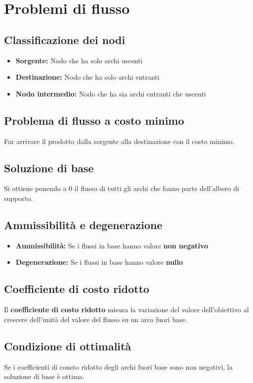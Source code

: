 \chapter{Problemi di flusso}

\section{Classificazione dei nodi}
\begin{itemize}
  \item \textbf{Sorgente:} Nodo che ha solo archi uscenti
  \item \textbf{Destinazione:} Nodo che ha solo archi entranti
  \item \textbf{Nodo intermedio:} Nodo che ha sia archi entranti che uscenti
\end{itemize}

\section{Problema di flusso a costo minimo}
Far arrivare il prodotto dalla sorgente alla destinazione con il costo minimo.

\section{Soluzione di base}
Si ottiene ponendo a $0$ il flusso di tutti gli archi che fanno parte dell'albero di supporto.

\section{Ammissibilit\`a e degenerazione}
\begin{itemize}
  \item \textbf{Ammissibilit\`a:} Se i flussi in base hanno valore \textbf{non negativo}
  \item \textbf{Degenerazione:} Se i flussi in base hanno valore \textbf{nullo}
\end{itemize}


\section{Coefficiente di costo ridotto}
Il \textbf{coefficiente di costo ridotto} misura la variazione del valore dell'obiettivo al crescere dell'unit\`a del valore del flusso su un arco fuori base.

\section{Condizione di ottimalit\`a}
Se i coefficienti di consto ridotto degli archi fuori base sono non negativi, la soluzione di base \`e ottima.


